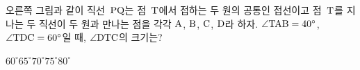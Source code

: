 \noindent\begin{minipage}[t]{0.58\linewidth}\vspace{0pt}\raggedright 오른쪽 그림과 같이 직선~$\mathrm{PQ}$는 점~$\mathrm{T}$에서 접하는 두 원의 공통인 접선이고 점~$\mathrm{T}$를 지나는 두 직선이 두 원과 만나는 점을 각각 $\mathrm{A}$, $\mathrm{B}$, $\mathrm{C}$, $\mathrm{D}$라 하자. $\angle\mathrm{TAB}=40^\circ$, $\angle\mathrm{TDC}=60^\circ$일 때, $\angle\mathrm{DTC}$의 크기는?\end{minipage}\hfill\begin{minipage}[t]{0.4\linewidth}\vspace{0pt}\centering \resizebox{\ifdim\width>\linewidth\linewidth\else\width\fi}{!}{}\end{minipage}\par
\begin{choices32}{$60^\circ$}{$65^\circ$}{$70^\circ$}{$75^\circ$}{$80^\circ$}\end{choices32}
